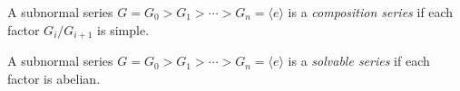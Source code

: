 A subnormal series $G = G_0 > G_1 > \cdots > G_n = \langle e \rangle$ is a \emph{composition series} if each factor $G_i/G_{i+1}$ is simple.

A subnormal series $G = G_0 > G_1 > \cdots > G_n = \langle e \rangle$ is a \emph{solvable series} if each factor is abelian.
